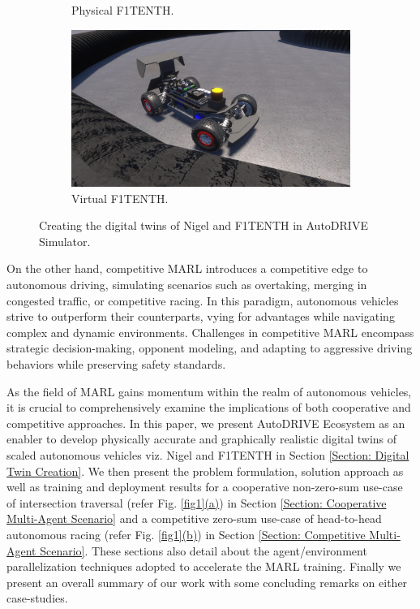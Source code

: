 \documentclass[letterpaper, 10 pt, conference]{ieeeconf}  %
\begin{document}
\begin{figure}[t]
\begin{subfigure}[b]{0.245\linewidth}
         \caption{Physical F1TENTH.}
         \label{fig2c}
     \end{subfigure}
     \hfill
     \begin{subfigure}[b]{0.245\linewidth}
         \centering
         \includegraphics[width=\linewidth]{Fig2d.png}
         \caption{Virtual F1TENTH.}
         \label{fig2d}
     \end{subfigure}
     \caption{Creating the digital twins of Nigel and F1TENTH in AutoDRIVE Simulator.}
    \label{fig2}
\end{figure}

On the other hand, competitive MARL \cite{fuchs2020, song2021, AutoRACE-2021, 9790832} introduces a competitive edge to autonomous driving, simulating scenarios such as overtaking, merging in congested traffic, or competitive racing. In this paradigm, autonomous vehicles strive to outperform their counterparts, vying for advantages while navigating complex and dynamic environments. Challenges in competitive MARL encompass strategic decision-making, opponent modeling, and adapting to aggressive driving behaviors while preserving safety standards.

As the field of MARL gains momentum within the realm of autonomous vehicles, it is crucial to comprehensively examine the implications of both cooperative and competitive approaches. In this paper, we present AutoDRIVE Ecosystem \cite{AutoDRIVE2023, AutoDRIVEReport2022} as an enabler to develop physically accurate and graphically realistic digital twins of scaled autonomous vehicles viz. Nigel \cite{10196233} and F1TENTH \cite{F1TENTH2019} in Section \ref{Section: Digital Twin Creation}. We then present the problem formulation, solution approach as well as training and deployment results for a cooperative non-zero-sum use-case of intersection traversal (refer Fig. \hyperref[fig1]{\ref*{fig1}(a)}) in Section \ref{Section: Cooperative Multi-Agent Scenario} and a competitive zero-sum use-case of head-to-head autonomous racing (refer Fig. \hyperref[fig1]{\ref*{fig1}(b)}) in Section \ref{Section: Competitive Multi-Agent Scenario}. These sections also detail about the agent/environment parallelization techniques adopted to accelerate the MARL training. Finally we present an overall summary of our work with some concluding remarks on either case-studies.
\end{document}
